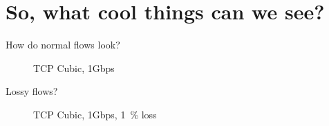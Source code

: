 \documentclass[aspectratio=169,xcolor={dvipsnames}
,notes
,handout
]{beamer}
\begin{document}
\section{So, what cool things can we see?}

\begin{frame}{How do normal flows look?}
	\begin{figure}
		\caption{TCP Cubic, 1Gbps}
	\end{figure}
\end{frame}

\begin{frame}{Lossy flows?}
	\begin{figure}
		\caption{TCP Cubic, 1Gbps, \SI{1}{\percent} loss}
	\end{figure}
\end{frame}
\end{document}
